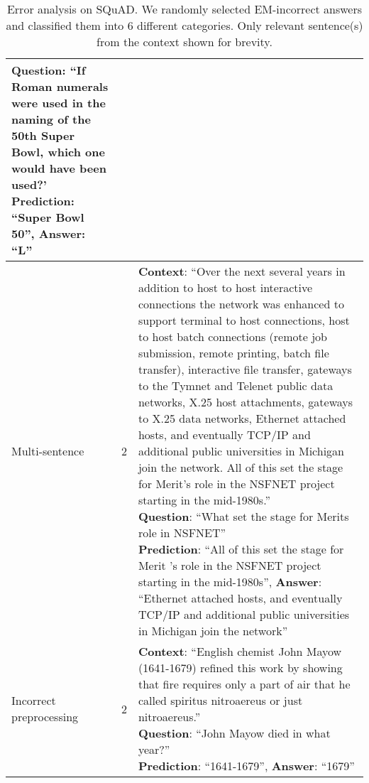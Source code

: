 \documentclass{article} \usepackage{iclr2017_conference,times}
\begin{document}
\begin{table}[!htb]
\begin{tabular}{L{2cm} C{1.5cm} L{9.5cm}}
{        \textbf{Question}: ``If Roman numerals were used in the naming of the 50th Super Bowl, which one would have been used?'\\
        \textbf{Prediction}: ``Super Bowl 50'',
        \textbf{Answer}: ``L''\\}\\
        \hline
        Multi-sentence & 2 & \parbox[t]{9cm}{\textbf{Context}: ``Over the next several years in addition to host to host interactive connections the network was enhanced to support terminal to host connections, host to host batch connections (remote job submission, remote printing, batch file transfer), interactive file transfer, gateways to the Tymnet and Telenet public data networks, X.25 host attachments, gateways to X.25 data networks, Ethernet attached hosts, and eventually TCP/IP and additional public universities in Michigan join the network. All of this set the stage for Merit's role in the NSFNET project starting in the mid-1980s.''\\
        \textbf{Question}: ``What set the stage for Merits role in NSFNET''\\
        \textbf{Prediction}: ``All of this set the stage for Merit 's role in the NSFNET project starting in the mid-1980s'',
        \textbf{Answer}: ``Ethernet attached hosts, and eventually TCP/IP and additional public universities in Michigan join the network''\\}\\
        \hline
        Incorrect preprocessing & 2 & \parbox[t]{9cm}{\textbf{Context}: ``English chemist John Mayow (1641-1679) refined this work by showing that fire requires only a part of air that he called spiritus nitroaereus or just nitroaereus.''\\
        \textbf{Question}: ``John Mayow died in what year?''\\
        \textbf{Prediction}: ``1641-1679'',
        \textbf{Answer}: ``1679''}\\
        
    \end{tabular}
    \caption{Error analysis on SQuAD. We randomly selected EM-incorrect answers and classified them into 6 different categories.
    Only relevant sentence(s) from the context shown for brevity. }
    \label{tab:error}
\end{table}
 
\end{document}
